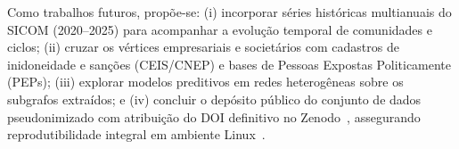 Como trabalhos futuros, propõe-se: (i) incorporar séries históricas multianuais do SICOM (2020--2025) para acompanhar a evolução temporal de comunidades e ciclos; (ii) cruzar os vértices empresariais e societários com cadastros de inidoneidade e sanções (CEIS/CNEP) e bases de Pessoas Expostas Politicamente (PEPs); (iii) explorar modelos preditivos em redes heterogêneas sobre os subgrafos extraídos; e (iv) concluir o depósito público do conjunto de dados pseudonimizado com atribuição do DOI definitivo no Zenodo~\cite{projeto_dataset_zenodo}, assegurando reprodutibilidade integral em ambiente Linux~\cite{projeto_github}.
